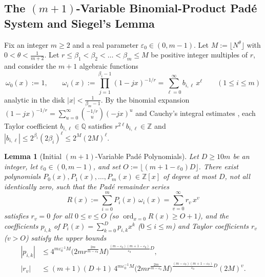 \documentclass[11pt,reqno]{amsart}
\newtheorem{lemma}[theorem]{Lemma}
\theoremstyle{remark}
\numberwithin{equation}{section}
\newcommand{\Z}{\mathbb{Z}}
\newcommand{\Q}{\mathbb{Q}}
\DeclareMathOperator{\ord}{ord}
\begin{document}
\subsection{The $(m + 1)$-Variable Binomial-Product Pad\'e System and Siegel's Lemma}
Fix an integer $m \ge 2$ and a real parameter $\varepsilon_0 \in (0, m - 1)$. Let $M := \lfloor N^\theta \rfloor$ with $0 < \theta < \frac{1}{m+2}$. Let $r \le \beta_1 < \beta_2 < \dots < \beta_m \le M$ be positive integer multiples of $r$, and consider the $m + 1$ algebraic functions
\begin{equation}\label{eq:7.2}
\omega_0(x) := 1, \qquad \omega_i(x) := \prod_{j=1}^{\beta_i-1} (1 - jx)^{-1/r} = \sum_{\ell=0}^\infty b_{i,\ell}\,x^\ell \qquad (1 \le i \le m)
\end{equation}
analytic in the disk $|x| < \frac{1}{\beta_m - 1}$. By the binomial expansion $(1 - jx)^{-1/r} = \sum_{u=0}^\infty \binom{-1/r}{u}(-jx)^u$ and Cauchy's integral estimates \cite[Lemma~4.2]{BuiPrattZaharescu2023}, each Taylor coefficient $b_{i,\ell} \in \Q$ satisfies $r^{2\ell} b_{i,\ell} \in \Z$ and $|b_{i,\ell}| \le 2^{\beta_i}(2\beta_i)^\ell \le 2^M(2M)^\ell$.

\begin{lemma}[{Initial $(m + 1)$-Variable Pad\'e Polynomials}]\label{lem:7.1}
Let $D \ge 10m$ be an integer, let $\varepsilon_0 \in (0, m - 1)$, and set $O := \lfloor (m + 1 - \varepsilon_0)D \rfloor$. There exist polynomials $P_0(x), P_1(x), \dots, P_m(x) \in \Z[x]$ of degree at most $D$, not all identically zero, such that the Pad\'e remainder series
\begin{equation}\label{eq:7.3}
R(x) := \sum_{i=0}^m P_i(x)\,\omega_i(x) = \sum_{v=0}^\infty r_v\,x^v
\end{equation}
satisfies $r_v = 0$ for all $0 \le v \le O$ (so $\ord_{x=0} R(x) \ge O + 1$), and the coefficients $p_{i,k}$ of $P_i(x) = \sum_{k=0}^D p_{i,k} x^k$ ($0 \le i \le m$) and Taylor coefficients $r_v$ ($v > O$) satisfy the upper bounds
\begin{equation}\label{eq:7.4}
\begin{aligned}
|p_{i,k}| &\le 4^{m\varepsilon_0^{-1}M} \bigl(2mr^{\frac{2m}{m-\varepsilon_0}} M\bigr)^{\frac{(m-\varepsilon_0)(m+1-\varepsilon_0)}{\varepsilon_0}D}, \\
|r_v| &\le (m+1)(D+1)\, 4^{m\varepsilon_0^{-1}M} \bigl(2mr^{\frac{2m}{m-\varepsilon_0}} M\bigr)^{\frac{(m-\varepsilon_0)(m+1-\varepsilon_0)}{\varepsilon_0}D} (2M)^v.
\end{aligned}
\end{equation}
\end{lemma}
\end{document}
